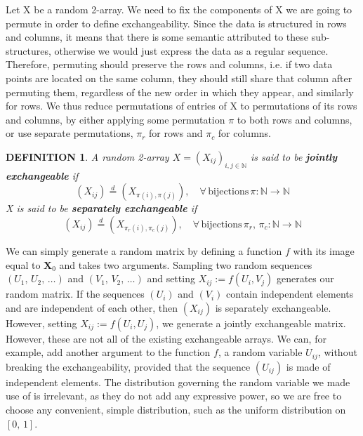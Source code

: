 \documentclass[12pt]{report}
\newtheorem{definition}[theorem]{DEFINITION}
\newcommand{\bs}{\boldsymbol}
\newcommand{\mb}[1]{\mathbb{#1}}
\renewcommand{\bs}{\boldsymbol}
\begin{document}
Let X be a random 2-array. We need to fix the components of X we are going to permute in order to define exchangeability. Since the data is structured in rows and columns, it means that there is some semantic attributed to these sub-structures, otherwise we would just express the data as a regular sequence. Therefore, permuting should preserve the rows and columns, i.e. if two data points are located on the same column, they should still share that column after permuting them, regardless of the new order in which they appear, and similarly for rows. We thus reduce permutations of entries of X to permutations of its rows and columns, by either applying some permutation $\pi$ to both rows and columns, or use separate permutations, $\pi_r$ for rows and $\pi_c$ for columns.

\begin{definition}
    A random 2-array $X = (X_{ij})_{i,j \in \mb{N}}$ is said to be \textbf{jointly exchangeable} if
    \begin{equation}
        (X_{ij}) \overset{d}{=} (X_{\pi (i), \pi (j)}), \quad \forall\, \text{bijections}\,\pi:\mb{N} \rightarrow \mb{N}
    \end{equation}
    X is said to be \textbf{separately exchangeable} if
    \begin{equation}
        (X_{ij}) \overset{d}{=} (X_{\pi_r (i), \pi_c (j)}), \quad \forall\, \text{bijections}\,\pi_r, \,\pi_c:\mb{N} \rightarrow \mb{N}
    \end{equation}
\end{definition}

We can simply generate a random matrix by defining a function $f$ with its image equal to $\bs{X}_0$ and takes two arguments. Sampling two random sequences $(U_1,\,U_2,\,\dots)$ and $(V_1,\,V_2,\,\dots)$ and setting $X_{ij} := f(U_i, V_j)$ generates our random matrix. If the sequences $(U_i)$ and $(V_i)$ contain independent elements and are independent of each other, then $(X_{ij})$ is separately exchangeable. However, setting $X_{ij} := f(U_i, U_j)$, we generate a jointly exchangeable matrix. However, these are not all of the existing exchangeable arrays. We can, for example, add another argument to the function $f$, a random variable $U_{ij}$, without breaking the exchangeability, provided that the sequence $(U_{ij})$ is made of independent elements. The distribution governing the random variable we made use of is irrelevant, as they do not add any expressive power, so we are free to choose any convenient, simple distribution, such as the uniform distribution on $[0,\, 1]$. \\
\end{document}
